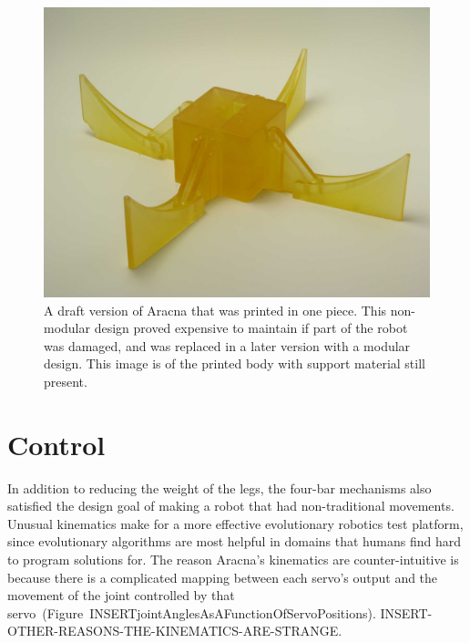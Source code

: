 \documentclass[letterpaper]{article}
\begin{document}
\begin{figure}[t]
\begin{center}
\includegraphics[width=.37\textwidth]{fig2.jpg}
\caption{A draft version of Aracna that was printed in one piece. This non-modular design proved expensive to maintain if part of the robot was damaged, and was replaced in a later version with a modular design. This image is of the printed body with support material still present.}
\label{notYetCleanedOnePieceRobot}
\end{center}
\end{figure}


\begin{table}[h]
\vskip 0.25cm
\caption{Estimated total cost. The cost of components and printing material reflect market prices from March 2012. A complete parts list is on our website \citep{WEB}.}
\label{tab:cost}
\end{table}


\section{Control}

In addition to reducing the weight of the legs, the four-bar
mechanisms also satisfied the design goal of making a robot that had
non-traditional movements. Unusual kinematics make for a more effective evolutionary robotics test platform, since evolutionary algorithms are most helpful in domains that humans find hard to program solutions for. The reason Aracna's kinematics are counter-intuitive is because there is a complicated mapping between each servo's output and the movement of the joint controlled by that servo~(Figure~INSERTjointAnglesAsAFunctionOfServoPositions). INSERT-OTHER-REASONS-THE-KINEMATICS-ARE-STRANGE. 
\end{document}
